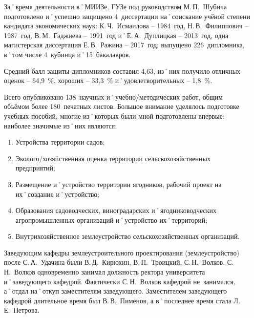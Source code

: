 За˚время деятельности в˚МИИЗе, ГУЗе под руководством М.\,П.~Шубича подготовлено и˚успешно защищено 4~диссертации на˚соискание учёной степени кандидата экономических наук: К.\,Ч.~Исмаилова \--- 1984~год, Н.\,В.~Филиппович \--- 1987~год, В.\,М.~Гаджиева \--- 1991~год и˚Е.\,А.~Дуплицкая \--- 2013~год, одна магистерская диссертация Е.\,В.~Ражина \--- 2017~год; выпущено 226~дипломника, в˚том числе 4~кубинца и˚15~бакалавров.

Средний балл защиты дипломников составил 4,63, из˚них получило отличных оценок \--- 64,9~\%, хороших \--- 33,3~\% и˚удовлетворительных \--- 1,8~\%.

Всего опубликовано 138~научных и˚учебно\-/методических работ, общим объёмом более 180~печатных листов. Большое внимание уделялось подготовке учебных пособий, многие из˚которых были мной подготовлены впервые: наиболее значимые из˚них являются: 
\begin{enumerate}
	\item Устройства территории садов; 
	\item Эколого\-/хозяйственная оценка территории сельскохозяйственных предприятий; 
	\item Размещение и˚устройство территории ягодников, рабочий проект на их˚создание и˚устройство; 
	\item Образования садоводческих, виноградарских и˚ягодниководческих агропромышленных организаций и˚устройство их˚территорий;
	\item Внутрихозяйственное землеустройство сельскохозяйственных организаций.
\end{enumerate}

Заведующим кафедры землеустроительного проектирования (землеустройство) после С.\,А.~Удачина были В.\,Д.~Кирюхин, В.\,П.~Троицкий, С.\,Н.~Волков. С.\,Н.~Волков одновременно занимал должность ректора университета и˚заведующего кафедрой. Фактически С.\,Н.~Волков кафедрой не~занимался, а˚отдал на˚откуп заместителям заведующего. Заместителем заведующего кафедрой длительное время был В.\,В.~Пименов, а в˚последнее время стала Л.\,Е.~Петрова. 

